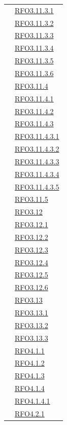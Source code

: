 \begin{itemize}
\begin{itemize}
\begin{itemize}
\begin{itemize}
\begin{longtable}{|>{\centering}m{5cm}|m{5cm}<{\centering}|}
& \hyperlink{RFO3.11.3.1}{RFO3.11.3.1}\\
& \hyperlink{RFO3.11.3.2}{RFO3.11.3.2}\\
& \hyperlink{RFO3.11.3.3}{RFO3.11.3.3}\\
& \hyperlink{RFO3.11.3.4}{RFO3.11.3.4}\\
& \hyperlink{RFO3.11.3.5}{RFO3.11.3.5}\\
& \hyperlink{RFO3.11.3.6}{RFO3.11.3.6}\\
& \hyperlink{RFO3.11.4}{RFO3.11.4}\\
& \hyperlink{RFO3.11.4.1}{RFO3.11.4.1}\\
& \hyperlink{RFO3.11.4.2}{RFO3.11.4.2}\\
& \hyperlink{RFO3.11.4.3}{RFO3.11.4.3}\\
& \hyperlink{RFO3.11.4.3.1}{RFO3.11.4.3.1}\\
& \hyperlink{RFO3.11.4.3.2}{RFO3.11.4.3.2}\\
& \hyperlink{RFO3.11.4.3.3}{RFO3.11.4.3.3}\\
& \hyperlink{RFO3.11.4.3.4}{RFO3.11.4.3.4}\\
& \hyperlink{RFO3.11.4.3.5}{RFO3.11.4.3.5}\\
& \hyperlink{RFO3.11.5}{RFO3.11.5}\\
& \hyperlink{RFO3.12}{RFO3.12}\\
& \hyperlink{RFO3.12.1}{RFO3.12.1}\\
& \hyperlink{RFO3.12.2}{RFO3.12.2}\\
& \hyperlink{RFO3.12.3}{RFO3.12.3}\\
& \hyperlink{RFO3.12.4}{RFO3.12.4}\\
& \hyperlink{RFO3.12.5}{RFO3.12.5}\\
& \hyperlink{RFO3.12.6}{RFO3.12.6}\\
& \hyperlink{RFO3.13}{RFO3.13}\\
& \hyperlink{RFO3.13.1}{RFO3.13.1}\\
& \hyperlink{RFO3.13.2}{RFO3.13.2}\\
& \hyperlink{RFO3.13.3}{RFO3.13.3}\\
& \hyperlink{RFO4.1.1}{RFO4.1.1}\\
& \hyperlink{RFO4.1.2}{RFO4.1.2}\\
& \hyperlink{RFO4.1.3}{RFO4.1.3}\\
& \hyperlink{RFO4.1.4}{RFO4.1.4}\\
& \hyperlink{RFO4.1.4.1}{RFO4.1.4.1}\\
& \hyperlink{RFO4.2.1}{RFO4.2.1}\\

\end{longtable}
\end{itemize}
\end{itemize}
\end{itemize}
\end{itemize}
